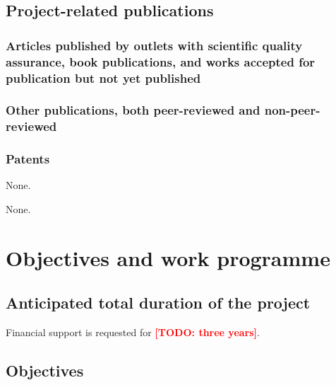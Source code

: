 \documentclass{scrartcl}
\newcommand{\todo}[1]{\xspace{\textcolor{red}{\bfseries[TODO: #1]}}\xspace}
\begin{document}
\lipsum[1]


\subsection{Project-related publications}

\subsubsection{Articles published by outlets with scientific quality assurance, book publications, and works accepted for publication but not yet published}
\printbibliography[category=reviewed, heading=none]

\subsubsection{Other publications, both peer-reviewed and non-peer-reviewed}
\printbibliography[category=nonreviewed, heading=none]

\subsubsection{Patents}

\printbibliography[category=patents_pending, heading=none]
None.

\printbibliography[category=patents, heading=none]
None.

\section{Objectives and work programme}

\subsection{Anticipated total duration of the project}
Financial support is requested for \todo{three years}.

\subsection{Objectives}
\let\oldpara=\theparagraph
\addtocounter{secnumdepth}{1}
\renewcommand{\theparagraph}{Goal \arabic{paragraph}}
\end{document}
